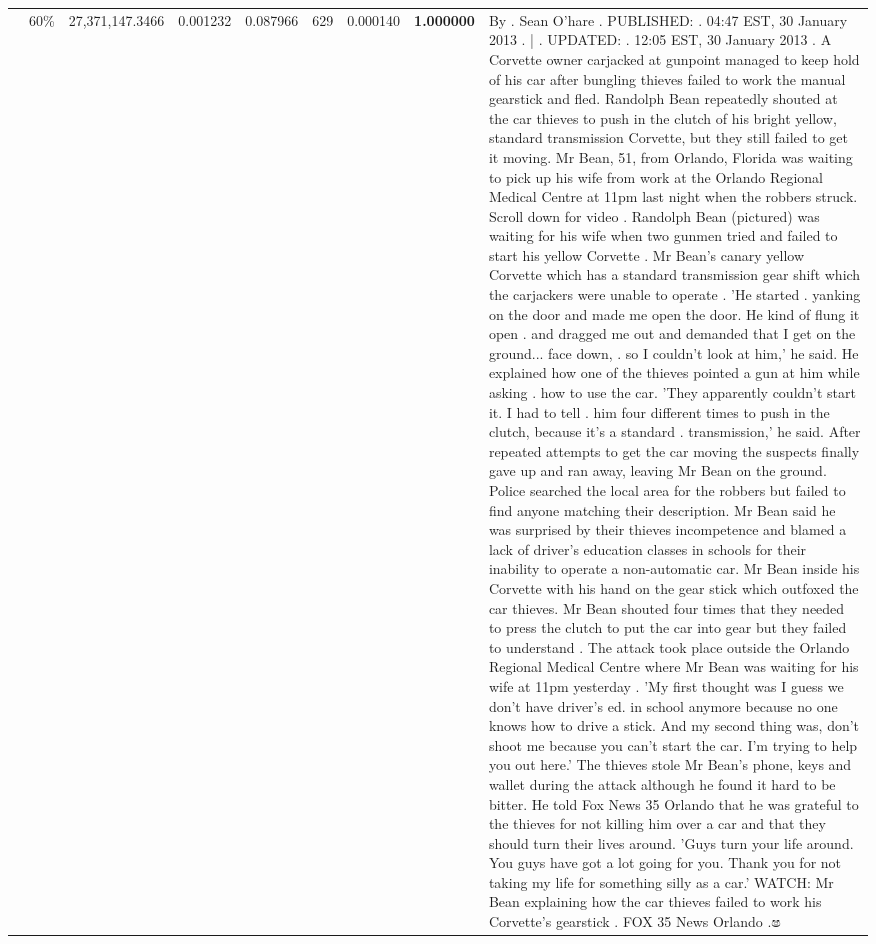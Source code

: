 \begin{table}[H]
\begin{tabular}{llrrrrrrl}
 & 60\% & 27,371,147.3466 & 0.001232 & 0.087966 & \color{red} 629 & 0.000140 & \bfseries \color{red} 1.000000 & By . Sean O'hare . PUBLISHED: . 04:47 EST, 30 January 2013 . | . UPDATED: . 12:05 EST, 30 January 2013 . A Corvette owner carjacked at gunpoint managed to keep hold of his car after bungling thieves failed to work the manual gearstick and fled. Randolph Bean repeatedly shouted at the car thieves to push in the clutch of his bright yellow, standard transmission Corvette, but they still failed to get it moving. Mr Bean, 51, from Orlando, Florida was waiting to pick up his wife from work at the Orlando Regional Medical Centre at 11pm last night when the robbers struck. Scroll down for video . Randolph Bean (pictured) was waiting for his wife when two gunmen tried and failed to start his yellow Corvette . Mr Bean's canary yellow Corvette which has a standard transmission gear shift which the carjackers were unable to operate . 'He started . yanking on the door and made me open the door. He kind of flung it open . and dragged me out and demanded that I get on the ground... face down, . so I couldn't look at him,' he said. He explained how one of the thieves pointed a gun at him while asking . how to use the car. 'They apparently couldn't start it. I had to tell . him four different times to push in the clutch, because it's a standard . transmission,' he said. After repeated attempts to get the car moving the suspects finally gave up and ran away, leaving Mr Bean on the ground. Police searched the local area for the robbers but failed to find anyone matching their description. Mr Bean said he was surprised by their thieves incompetence and blamed a lack of driver's education classes in schools for their inability to operate a non-automatic car. Mr Bean inside his Corvette with his hand on the gear stick which outfoxed the car thieves. Mr Bean shouted four times that they needed to press the clutch to put the car into gear but they failed to understand . The attack took place outside the Orlando Regional Medical Centre where Mr Bean was waiting for his wife at 11pm yesterday . 'My first thought was I guess we don't have driver's ed. in school anymore because no one knows how to drive a stick. And my second thing was, don't shoot me because you can't start the car. I'm trying to help you out here.' The thieves stole Mr Bean's phone, keys and wallet during the attack although he found it hard to be bitter. He told Fox News 35 Orlando that he was grateful to the thieves for not killing him over a car and that they should turn their lives around. 'Guys turn your life around. You guys have got a lot going for you. Thank you for not taking my life for something silly as a car.' WATCH: Mr Bean explaining how the car thieves failed to work his Corvette's gearstick . FOX 35 News Orlando .ෂ \\

\end{tabular}
\end{table}
